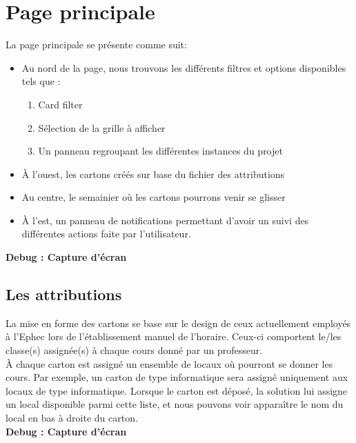 \section{Page principale}
La page principale se présente comme suit:\\

\begin{itemize}	
	
	\item Au nord de la page, nous trouvons les différents filtres et options disponibles tels que :
	\begin{enumerate}
		\item Card filter
		\item Sélection de la grille à afficher
		\item Un panneau regroupant les différentes instances du projet\\
	\end{enumerate}
	\item À l'ouest, les cartons créés sur base du fichier des attributions\\
	\item Au centre, le semainier où les cartons pourrons venir se glisser\\
	\item À l'est, un panneau de notifications permettant d'avoir un suivi des différentes actions faite par l'utilisateur.
\end{itemize}
\bigskip

\textbf{Debug : Capture d'écran}

\subsection{Les attributions}
La mise en forme des cartons se base sur le design de ceux actuellement employés à l'Ephec lors de l'établissement manuel de l'horaire. Ceux-ci comportent le/les classe(s) assignée(s) à chaque cours donné par un professeur.\\
\newline
\indent
À chaque carton est assigné un ensemble de locaux où pourront se donner les cours. Par exemple, un carton de type informatique sera assigné uniquement aux locaux de type informatique. Lorsque le carton est déposé, la solution lui assigne un local disponible parmi cette liste, et nous pouvons voir apparaître le nom du local en bas à droite du carton.\\
\newline
\indent
\textbf{Debug : Capture d'écran}

